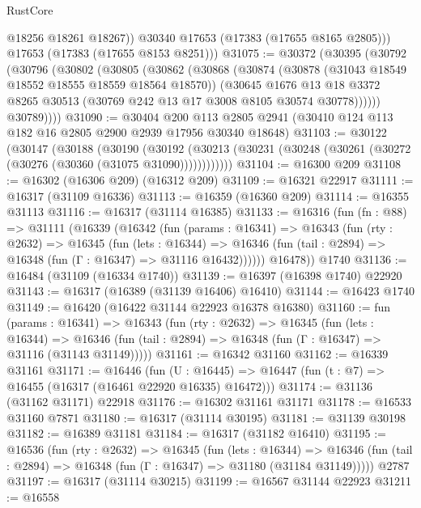 \begin{lexlean}{RustCore}
\begin{coremodule}
            @18256
            @18261
            @18267))
        @30340
        @17653
        (@17383 (@17655 @8165 @2805)))
      @17653
      (@17383 (@17655 @8153 @8251)))
@31075 := @30372
    (@30395
      (@30792
        (@30796
          (@30802
            (@30805
              (@30862
                (@30868
                  (@30874
                    (@30878 (@31043 @18549 @18552 @18555 @18559 @18564 @18570))
                    (@30645
                      @1676
                      @13
                      @18
                      @3372
                      @8265
                      @30513
                      (@30769 @242 @13 @17 @3008 @8105 @30574 @30778))))))
            @30789))))
@31090 := @30404
    @200
    @113
    @2805
    @2941
    (@30410 @124 @113 @182 @16 @2805 @2900 @2939 @17956 @30340 @18648)
@31103 := @30122
    (@30147
      (@30188
        (@30190
          (@30192 (@30213 (@30231 (@30248 (@30261 (@30272 (@30276 (@30360 (@31075 @31090))))))))))))
@31104 := @16300 @209
@31108 := @16302 (@16306 @209) (@16312 @209)
@31109 := @16321 @22917
@31111 := @16317 (@31109 @16336)
@31113 := @16359 (@16360 @209)
@31114 := @16355 @31113
@31116 := @16317 (@31114 @16385)
@31133 := @16316
    (fun (fn : @88) =>
    @31111
      (@16339
        (@16342
          (fun (params : @16341) =>
          @16343
            (fun (rty : @2632) =>
            @16345
              (fun (lets : @16344) =>
              @16346 (fun (tail : @2894) => @16348 (fun (Γ : @16347) => @31116 @16432))))))
        @16478))
    @1740
@31136 := @16484 (@31109 (@16334 @1740))
@31139 := @16397 (@16398 @1740) @22920
@31143 := @16317 (@16389 (@31139 @16406) @16410)
@31144 := @16423 @1740
@31149 := @16420 (@16422 @31144 @22923 @16378 @16380)
@31160 := fun (params : @16341) =>
  @16343
    (fun (rty : @2632) =>
    @16345
      (fun (lets : @16344) =>
      @16346 (fun (tail : @2894) => @16348 (fun (Γ : @16347) => @31116 (@31143 @31149)))))
@31161 := @16342 @31160
@31162 := @16339 @31161
@31171 := @16446
    (fun (U : @16445) => @16447 (fun (t : @7) => @16455 (@16317 (@16461 @22920 @16335) @16472)))
@31174 := @31136 (@31162 @31171) @22918
@31176 := @16302 @31161 @31171
@31178 := @16533 @31160 @7871
@31180 := @16317 (@31114 @30195)
@31181 := @31139 @30198
@31182 := @16389 @31181
@31184 := @16317 (@31182 @16410)
@31195 := @16536
    (fun (rty : @2632) =>
    @16345
      (fun (lets : @16344) =>
      @16346 (fun (tail : @2894) => @16348 (fun (Γ : @16347) => @31180 (@31184 @31149)))))
    @2787
@31197 := @16317 (@31114 @30215)
@31199 := @16567 @31144 @22923
@31211 := @16558

\end{coremodule}
\end{lexlean}
